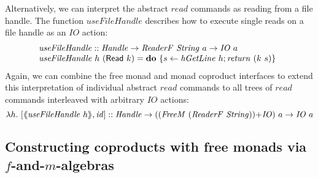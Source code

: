 \documentclass{jfp1}
\newcommand{\fmext}[1]{\langle\kern-0.25em\langle #1 \rangle\kern-0.25em\rangle}
\newcommand{\kw}[1]{\textbf{#1}}
\begin{document}
Alternatively, we can interpret the abstract $\mathit{read}$ commands
as reading from a file handle. The function $\mathit{useFileHandle}$
describes how to execute single reads on a file handle as an $\mathit{IO}$ action:
\begin{displaymath}
  \begin{array}{@{}l}
    \mathit{useFileHandle} :: \mathit{Handle} \to \mathit{ReaderF}~\mathit{String}~a \to \mathit{IO}~a \\
    \mathit{useFileHandle}~h~(\mathsf{Read}~k) = \kw{do}~\{ s \leftarrow \mathit{hGetLine}~h; \mathit{return}~(k~s) \}
  \end{array}
\end{displaymath}
Again, we can combine the free monad and monad coproduct interfaces to
extend this interpretation of individual abstract $\mathit{read}$
commands to all trees of $\mathit{read}$ commands interleaved with
arbitrary $\mathit{IO}$ actions:
\begin{displaymath}
  \lambda h.~[\fmext{\mathit{useFileHandle}~h}, \mathit{id}] :: \mathit{Handle} \to (\cprd{(\mathit{FreeM}~(\mathit{ReaderF}~\mathit{String}))}{\mathit{IO}})~a \to \mathit{IO}~a
\end{displaymath}

\subsection{Constructing coproducts with free monads via \texorpdfstring{$f$}{f}-and-\texorpdfstring{$m$}{m}-algebras}
\label{sec:construct-coproducts}
\end{document}
